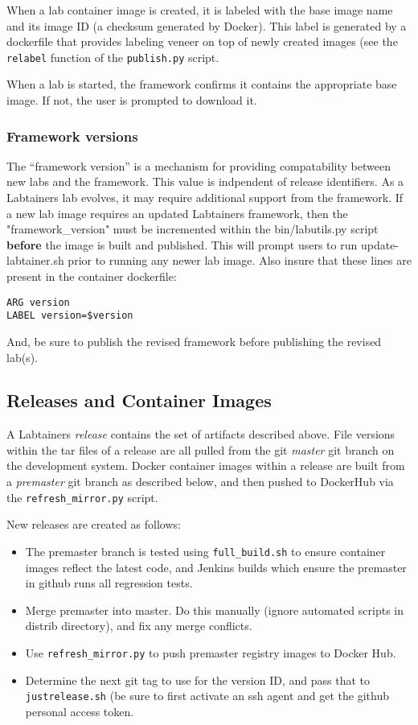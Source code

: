 \documentclass[12pt]{article}
\begin{document}
When a lab container image is created, it is labeled with the base image name and its image ID (a checksum generated by Docker).
This label is generated by a dockerfile that provides labeling veneer on top of newly created images (see the {\tt relabel} function
of the {\tt publish.py} script.

When a lab is started, the framework confirms it contains the appropriate base image.  If not, the user is prompted to download it.

\subsubsection{Framework versions}
The ``framework version'' is a mechanism for providing compatability between new labs and the framework.  This value is indpendent of
release identifiers. As a Labtainers lab evolves, it may require additional support from the framework.   If a new lab image requires
an updated Labtainers framework, then the "framework\_version" must be incremented within the
bin/labutils.py script \textbf{before} the image is built and published.  This will prompt users
to run update-labtainer.sh prior to running any newer lab image.
Also insure that these lines are present in the container dockerfile:
\begin{verbatim}
ARG version
LABEL version=$version
\end{verbatim}
\noindent And, be sure to publish the revised framework before publishing the revised lab(s).


\subsection{Releases and Container Images}
A Labtainers \textit{release} contains the set of artifacts described above.  File versions within the tar files
of a release are all pulled from the git \textit{master} git branch on the development system.  Docker container images within a release are built from a 
\textit{premaster} git branch as described below, and then pushed to DockerHub via the {\tt refresh\_mirror.py} script.

New releases are created as follows:
\begin{itemize}
\item The premaster branch is tested using {\tt full\_build.sh} to ensure container images reflect the latest code, and Jenkins builds which
ensure the premaster in github runs all regression tests.
\item Merge premaster into master.  Do this manually (ignore automated scripts in distrib directory), and fix any merge conflicts.
\item Use {\tt refresh\_mirror.py} to push premaster registry images to Docker Hub.
\item Determine the next git tag to use for the version ID, and pass that to {\tt justrelease.sh} (be sure to first activate an
ssh agent and get the github personal access token.
\end{itemize}
\end{document}
